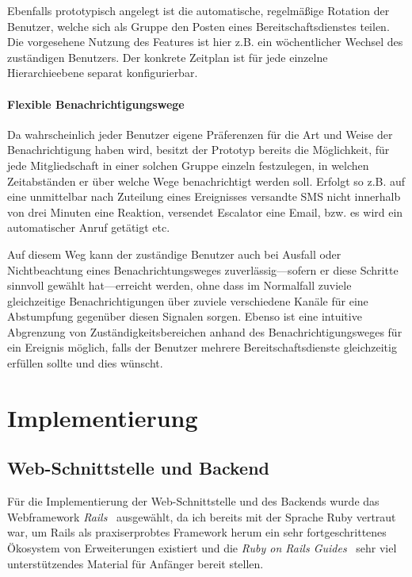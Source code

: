 \documentclass[11pt,utf8,notoc,bibnum,german,final]{zihpub}
\begin{document}
Ebenfalls prototypisch angelegt ist die automatische, regelmäßige Rotation der
Benutzer, welche sich als Gruppe den Posten eines Bereitschaftsdienstes teilen.
Die vorgesehene Nutzung des Features ist hier z.B. ein wöchentlicher Wechsel
des zuständigen Benutzers. Der konkrete Zeitplan ist für jede einzelne
Hierarchieebene separat konfigurierbar.

\paragraph{Flexible Benachrichtigungswege}

Da wahrscheinlich jeder Benutzer eigene Präferenzen für die Art und Weise der
Benachrichtigung haben wird, besitzt der Prototyp bereits die Möglichkeit, für
jede Mitgliedschaft in einer solchen Gruppe einzeln festzulegen, in welchen
Zeitabständen er über welche Wege benachrichtigt werden soll. Erfolgt so z.B.
auf eine unmittelbar nach Zuteilung eines Ereignisses versandte SMS nicht
innerhalb von drei Minuten eine Reaktion, versendet Escalator eine Email, bzw.
es wird ein automatischer Anruf getätigt etc.

Auf diesem Weg kann der zuständige Benutzer auch bei Ausfall oder
Nichtbeachtung eines Benachrichtungsweges zuverlässig—sofern er diese Schritte
sinnvoll gewählt hat—erreicht werden, ohne dass im Normalfall zuviele
gleichzeitige Benachrichtigungen über zuviele verschiedene Kanäle für eine
Abstumpfung gegenüber diesen Signalen sorgen. Ebenso ist eine intuitive
Abgrenzung von Zuständigkeitsbereichen anhand des Benachrichtigungsweges für
ein Ereignis möglich, falls der Benutzer mehrere Bereitschaftsdienste
gleichzeitig erfüllen sollte und dies wünscht.

\section{Implementierung}

\subsection{Web-Schnittstelle und Backend}

Für die Implementierung der Web-Schnittstelle und des Backends wurde das
Webframework \emph{Rails}~\cite{rails} ausgewählt, da ich bereits mit der Sprache
Ruby vertraut war, um Rails als praxiserprobtes Framework herum ein sehr
fortgeschrittenes Ökosystem von Erweiterungen existiert und die \emph{Ruby on Rails
Guides}~\cite{rails-guides} sehr viel unterstützendes Material für Anfänger
bereit stellen.
\end{document}
